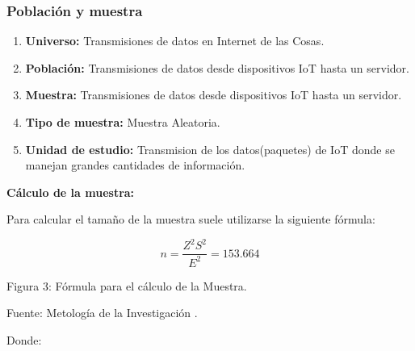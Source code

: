             \subsubsection{Población y muestra}    
                \vskip 0.3cm
                \begin{enumerate}
                    \item[]{{\bf Universo:} Transmisiones de datos en Internet de las Cosas.}
                    \item[]{{\bf Población:} Transmisiones de datos desde dispositivos IoT hasta un servidor.}
                    \item[]{{\bf Muestra:} Transmisiones de datos desde dispositivos IoT hasta un servidor.}
                    \item[]{{\bf Tipo de muestra:} Muestra Aleatoria.}
                    \item[]{{\bf Unidad de estudio:} Transmision de los datos(paquetes) de IoT donde se manejan grandes cantidades de información.}
                \end{enumerate}\par                 
                \vskip 0.3cm

                \newpage
                {\bf Cálculo de la muestra:}\par
                \vskip 0.3cm

                Para calcular el tamaño de la muestra suele utilizarse la siguiente fórmula:\par
                \begin{equation*}\label{}
                    n = \frac{Z^{2}S^{2}}{E^{2}} = 153.664
                \end{equation*}
                \begin{center}
                    { Figura 3: Fórmula para el cálculo de la Muestra.}\par
                    { Fuente: Metología de la Investigación {\cite{sampieri1997}}. }\par
                \end{center} 
                \vskip 0.3cm   

                Donde:
                \vskip 0.3cm

